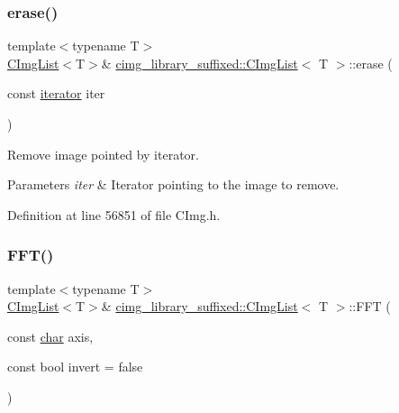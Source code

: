 \subsubsection{\texorpdfstring{erase()}{erase()}}
{\footnotesize\ttfamily template$<$typename T$>$ \\
\hyperlink{structcimg__library__suffixed_1_1CImgList}{C\+Img\+List}$<$T$>$\& \hyperlink{structcimg__library__suffixed_1_1CImgList}{cimg\+\_\+library\+\_\+suffixed\+::\+C\+Img\+List}$<$ T $>$\+::erase (\begin{DoxyParamCaption}\item[{const \hyperlink{structcimg__library__suffixed_1_1CImgList_a9d3e27da63f536e04fc7249f8e13dba0}{iterator}}]{iter }\end{DoxyParamCaption})\hspace{0.3cm}{\ttfamily [inline]}}



Remove image pointed by iterator. 


\begin{DoxyParams}{Parameters}
{\em iter} & Iterator pointing to the image to remove. \\
\hline
\end{DoxyParams}


Definition at line 56851 of file C\+Img.\+h.

\mbox{\label{structcimg__library__suffixed_1_1CImgList_ac07f7527b6223ed7b6c4e02f6feab7b3}} 
\subsubsection{\texorpdfstring{F\+F\+T()}{FFT()}\hspace{0.1cm}{\footnotesize\ttfamily [1/2]}}
{\footnotesize\ttfamily template$<$typename T$>$ \\
\hyperlink{structcimg__library__suffixed_1_1CImgList}{C\+Img\+List}$<$T$>$\& \hyperlink{structcimg__library__suffixed_1_1CImgList}{cimg\+\_\+library\+\_\+suffixed\+::\+C\+Img\+List}$<$ T $>$\+::F\+FT (\begin{DoxyParamCaption}\item[{const \hyperlink{classchar}{char}}]{axis,  }\item[{const bool}]{invert = {\ttfamily false} }\end{DoxyParamCaption})\hspace{0.3cm}{\ttfamily [inline]}}



